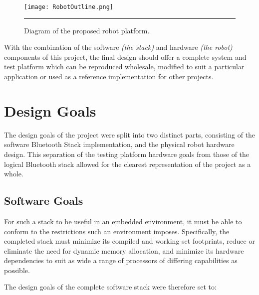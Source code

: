 \begin{figure}[H]
	\centering
		\texttt{[image: RobotOutline.png]}
	\rule{35em}{0.5pt}
	\caption[Diagram of the proposed robot]{Diagram of the proposed robot platform.}
	\label{fig:robotoutline}
\end{figure}

With the combination of the software \emph{(the stack)} and hardware \emph{(the robot)} components of this project, the final design should offer a complete system and test platform which can be reproduced wholesale, modified to suit a particular application or used as a reference implementation for other projects.

\section{Design Goals}

The design goals of the project were split into two distinct parts, consisting of the software Bluetooth Stack implementation, and the physical robot hardware design. This separation of the testing platform hardware goals from those of the logical Bluetooth stack allowed for the clearest representation of the project as a whole.

\subsection{Software Goals}

For such a stack to be useful in an embedded environment, it must be able to conform to the restrictions such an environment imposes. Specifically, the completed stack must minimize its compiled and working set footprints, reduce or eliminate the need for dynamic memory allocation, and minimize its hardware dependencies to suit as wide a range of processors of differing capabilities as possible.

The design goals of the complete software stack were therefore set to:

